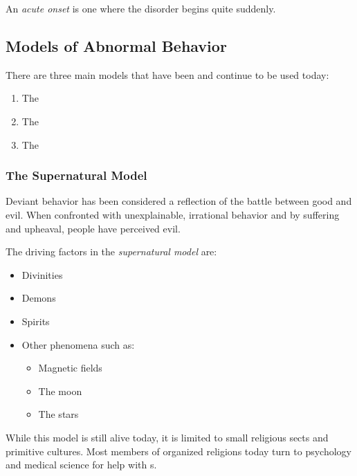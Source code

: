 \begin{definition}\label{def:Insidious_Onset}
  An \emph{acute onset}  is one where the disorder begins quite suddenly.
\end{definition}

\subsection{Models of Abnormal Behavior}\label{subsec:Models_Abnormal_Behavior}
There are three main models that have been and continue to be used today:
\begin{enumerate}[noitemsep]
\item The 
\item The 
\item The 
\end{enumerate}

\subsubsection{The Supernatural Model}\label{subsubsec:Supernatural_Model}
Deviant behavior has been considered a reflection of the battle between good and evil.
When confronted with unexplainable, irrational behavior and by suffering and upheaval, people have perceived evil.

\begin{definition}\label{def:Supernatural_Model}
  The driving factors in the \emph{supernatural model} are:
  \begin{itemize}[noitemsep]
  \item Divinities
  \item Demons
  \item Spirits
  \item Other phenomena such as:
    \begin{itemize}[noitemsep]
    \item Magnetic fields
    \item The moon
    \item The stars
    \end{itemize}
  \end{itemize}
\end{definition}

While this model is still alive today, it is limited to small religious sects and primitive cultures.
Most members of organized religions today turn to psychology and medical science for help with s.

